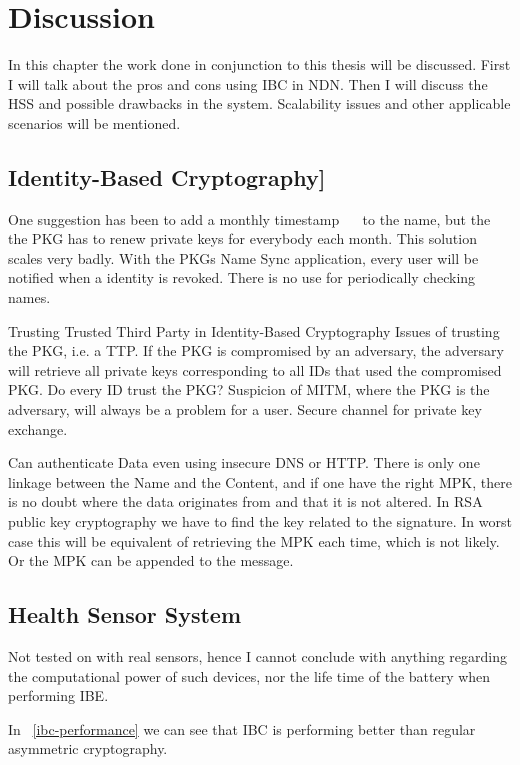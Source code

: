 \chapter{Discussion}
In this chapter the work done in conjunction to this thesis will be discussed. 
First I will talk about the pros and cons using \gls{IBC} in \gls{NDN}.
Then I will discuss the \gls{HSS} and possible drawbacks in the system. 
Scalability issues and other applicable scenarios will be mentioned.

\section{Identity-Based Cryptography]}
One suggestion has been to add a monthly timestamp~\cite{DBLP:journals/iacr/BoldyrevaGK12} ~\cite{DBLP:conf/ctrsa/LibertV09}  to the name, but the the \gls{PKG} has to renew private keys for everybody each month. 
This solution scales very badly.
With the \gls{PKG}s Name Sync application, every user will be notified when a identity is revoked.
There is no use for periodically checking names.

Trusting Trusted Third Party in Identity-Based Cryptography
Issues of trusting the \gls{PKG}, i.e. a \gls{TTP}. 
If the \gls{PKG} is compromised by an adversary, the adversary will retrieve all private keys corresponding to all IDs that used the compromised \gls{PKG}. 
Do every ID trust the \gls{PKG}? Suspicion of \gls{MITM}, where the \gls{PKG} is the adversary, will always be a problem for a user.
Secure channel for private key exchange. 

Can authenticate Data even using insecure DNS or HTTP. 
There is only one linkage between the Name and the Content, and if one have the right \gls{MPK}, there is no doubt where the data originates from and that it is not altered.
In RSA public key cryptography we have to find the key related to the signature. 
In worst case this will be equivalent of retrieving the \gls{MPK} each time, which is not likely. 
Or the \gls{MPK} can be appended to the message.

\section{Health Sensor System}
Not tested on with real sensors, hence I cannot conclude with anything regarding the computational power of such devices, nor the life time of the battery when performing \gls{IBE}.  

In ~\autoref{ibc-performance} we can see that \gls{IBC} is performing better than regular asymmetric cryptography. 

